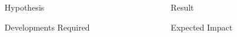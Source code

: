 \documentclass[final,t]{beamer}
\newcommand{\ACMELarge}{\fontsize{72}{86}\selectfont}
\begin{document}
\begin{frame}[fragile]{}


  \LARGE
  \begin{columns}[t]


    \begin{column}{0.01\linewidth}
    \end{column}

    \begin{column}{0.48\linewidth}
      \begin{block}{\ACMELarge Hypothesis}
      \end{block}
      
      \begin{block}{\ACMELarge Developments Required}
      \end{block}
    \end{column}


    \begin{column}{0.01\linewidth}
    \end{column}

    \begin{column}{0.48\linewidth}
      \begin{block}{\ACMELarge Result}
      \end{block}
      
      \begin{block}{\ACMELarge Expected Impact}
      \end{block}

    \end{column}
    
  \end{columns}

\end{frame}
\end{document}
